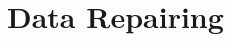 \documentclass[letterpaper, 12pt]{report}
\theoremstyle{definition}
\newtheorem{mydef}{Définition}
\newtheorem{myexample}{Exemple}
\begin{document}
%

%
%
%

\chapter{Data Repairing}
\end{document}
